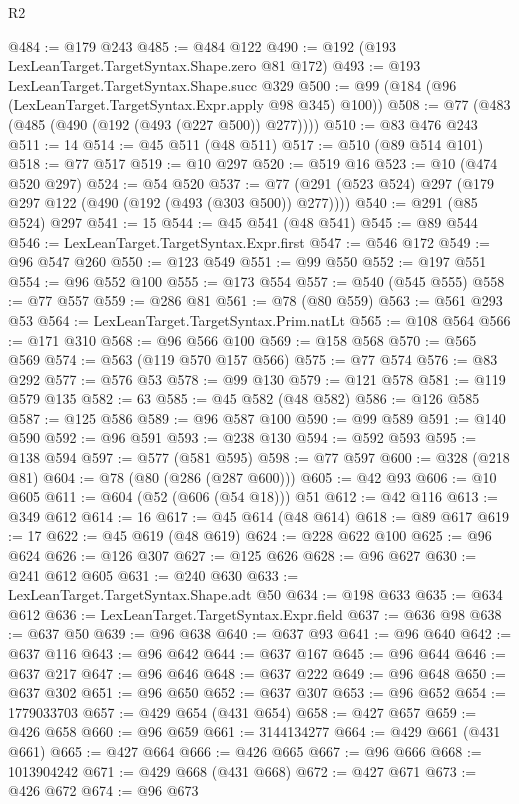 \begin{lexlean}{R2}
\begin{coremodule}
@484 := @179 @243
@485 := @484 @122
@490 := @192 (@193 LexLeanTarget.TargetSyntax.Shape.zero @81 @172)
@493 := @193 LexLeanTarget.TargetSyntax.Shape.succ @329
@500 := @99 (@184 (@96 (LexLeanTarget.TargetSyntax.Expr.apply @98 @345) @100))
@508 := @77 (@483 (@485 (@490 (@192 (@493 (@227 @500)) @277))))
@510 := @83 @476 @243
@511 := 14
@514 := @45 @511 (@48 @511)
@517 := @510 (@89 @514 @101)
@518 := @77 @517
@519 := @10 @297
@520 := @519 @16
@523 := @10 (@474 @520 @297)
@524 := @54 @520
@537 := @77 (@291 (@523 @524) @297 (@179 @297 @122 (@490 (@192 (@493 (@303 @500)) @277))))
@540 := @291 (@85 @524) @297
@541 := 15
@544 := @45 @541 (@48 @541)
@545 := @89 @544
@546 := LexLeanTarget.TargetSyntax.Expr.first
@547 := @546 @172
@549 := @96 @547 @260
@550 := @123 @549
@551 := @99 @550
@552 := @197 @551
@554 := @96 @552 @100
@555 := @173 @554
@557 := @540 (@545 @555)
@558 := @77 @557
@559 := @286 @81
@561 := @78 (@80 @559)
@563 := @561 @293 @53
@564 := LexLeanTarget.TargetSyntax.Prim.natLt
@565 := @108 @564
@566 := @171 @310
@568 := @96 @566 @100
@569 := @158 @568
@570 := @565 @569
@574 := @563 (@119 @570 @157 @566)
@575 := @77 @574
@576 := @83 @292
@577 := @576 @53
@578 := @99 @130
@579 := @121 @578
@581 := @119 @579 @135
@582 := 63
@585 := @45 @582 (@48 @582)
@586 := @126 @585
@587 := @125 @586
@589 := @96 @587 @100
@590 := @99 @589
@591 := @140 @590
@592 := @96 @591
@593 := @238 @130
@594 := @592 @593
@595 := @138 @594
@597 := @577 (@581 @595)
@598 := @77 @597
@600 := @328 (@218 @81)
@604 := @78 (@80 (@286 (@287 @600)))
@605 := @42 @93
@606 := @10 @605
@611 := @604 (@52 (@606 (@54 @18))) @51
@612 := @42 @116
@613 := @349 @612
@614 := 16
@617 := @45 @614 (@48 @614)
@618 := @89 @617
@619 := 17
@622 := @45 @619 (@48 @619)
@624 := @228 @622 @100
@625 := @96 @624
@626 := @126 @307
@627 := @125 @626
@628 := @96 @627
@630 := @241 @612 @605
@631 := @240 @630
@633 := LexLeanTarget.TargetSyntax.Shape.adt @50
@634 := @198 @633
@635 := @634 @612
@636 := LexLeanTarget.TargetSyntax.Expr.field
@637 := @636 @98
@638 := @637 @50
@639 := @96 @638
@640 := @637 @93
@641 := @96 @640
@642 := @637 @116
@643 := @96 @642
@644 := @637 @167
@645 := @96 @644
@646 := @637 @217
@647 := @96 @646
@648 := @637 @222
@649 := @96 @648
@650 := @637 @302
@651 := @96 @650
@652 := @637 @307
@653 := @96 @652
@654 := 1779033703
@657 := @429 @654 (@431 @654)
@658 := @427 @657
@659 := @426 @658
@660 := @96 @659
@661 := 3144134277
@664 := @429 @661 (@431 @661)
@665 := @427 @664
@666 := @426 @665
@667 := @96 @666
@668 := 1013904242
@671 := @429 @668 (@431 @668)
@672 := @427 @671
@673 := @426 @672
@674 := @96 @673

\end{coremodule}
\end{lexlean}
